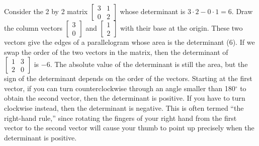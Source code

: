     
Consider the 2 by 2 matrix $\begin{bmatrix}3&1\\0&2\end{bmatrix}$ whose determinant is $3\cdot 2-0\cdot 1=6$. Draw the column vectors $\begin{bmatrix}3\\0\end{bmatrix}$ and $\begin{bmatrix}1\\2\end{bmatrix}$ with their base at the origin. 
These two vectors give the edges of a parallelogram whose area is the determinant ($6$).  If we swap the order of the two vectors in the matrix, then the determinant of $\begin{bmatrix}1&3\\2&0\end{bmatrix}$ is $-6$.  The absolute value of the determinant is still the area, but the sign of the determinant depends on the order of the vectors. Starting at the first vector, if you can turn counterclockwise through an angle smaller than 180$^\circ$ to obtain the second vector, then the determinant is positive.  If you have to turn clockwise instead, then the determinant is negative.  This is often termed ``the right-hand rule,'' since rotating the fingers of your right hand from the first vector to the second vector will cause your thumb to point up precisely when the determinant is positive.

